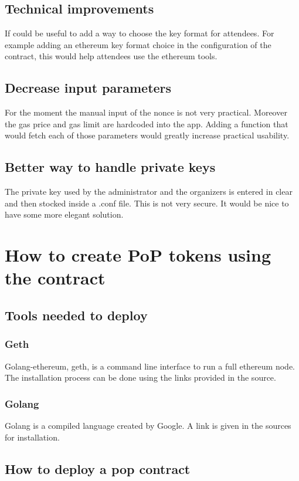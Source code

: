 \documentclass[11pt, a4paper, twoside, openright]{book} %
\begin{document}
\subsection{Technical improvements}
If could be useful to add a way to choose the key format for attendees. For example adding an ethereum key format choice in the configuration of the contract, this would help attendees use the ethereum tools. 

\subsection{Decrease input parameters}
For the moment the manual input of the nonce is not very practical. Moreover the gas price and gas limit are hardcoded into the app. Adding a function that would fetch each of those parameters would greatly increase practical usability. 

\subsection{Better way to handle private keys}
The private key used by the administrator and the organizers is entered in clear and then stocked inside a .conf file. This is not very secure. It would be nice to have some more elegant solution.




\section{How to create PoP tokens using the contract}

\subsection{Tools needed to deploy}
\subsubsection*{Geth}
Golang-ethereum, geth, is a command line interface to run a full ethereum node. The installation process can be done using the links provided in the source.
\subsubsection*{Golang}
Golang is a compiled language created by Google. A link is given in the sources for installation. 

\subsection{How to deploy a pop contract}
\end{document}
